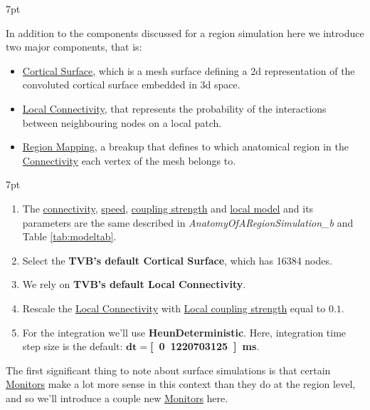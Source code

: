 \documentclass{tufte-handout}
\newenvironment{simulation}{%
  \def\FrameCommand{%
    \hspace{1pt}%
    {\color{ForestGreen}\vrule width 2pt}%
    {\color{simulationshade}\vrule width 4pt}%
    \colorbox{simulationshade}%
  }%
  \MakeFramed{\advance\hsize-\width\FrameRestore}%
  \noindent\hspace{-4.55pt}%
  \begin{adjustwidth}{}{7pt}%
  \vspace{2pt}\vspace{2pt}%
}
{%
  \vspace{2pt}\end{adjustwidth}\endMakeFramed%
}
\newenvironment{blah}{%
  \def\FrameCommand{%
    \hspace{1pt}%
    {\color{DarkOrange}\vrule width 2pt}%
    {\color{PeachPuff}\vrule width 4pt}%
    \colorbox{PeachPuff}%
  }%
  \MakeFramed{\advance\hsize-\width\FrameRestore}%
  \noindent\hspace{-4.55pt}%
  \begin{adjustwidth}{}{7pt}%
  \vspace{2pt}\vspace{2pt}%
}
{%
  \vspace{2pt}\end{adjustwidth}\endMakeFramed%
}
\begin{document}
\begin{blah}
In addition to the components discussed for a
region simulation here we introduce two major components, that is:
\begin{itemize}
\item \underline{Cortical Surface}, which is a mesh surface defining
a 2d representation of the convoluted cortical surface embedded in 3d space.
\item \underline{Local Connectivity}, that represents the probability of the interactions between neighbouring nodes on a local patch. 
\item \underline{Region Mapping},  a breakup that defines to which anatomical region in the \underline{Connectivity} each vertex of the mesh belongs to. 
\end{itemize}
\end{blah}

\begin{simulation}
\begin{enumerate}
\item The \underline{connectivity}, \underline{speed}, \underline{coupling strength} and \underline{local model} and its parameters are the same described in  \textit{AnatomyOfARegionSimulation\_b} and Table \ref{tab:modeltab}.
\item Select the \textbf{TVB's default Cortical Surface}, which has 16384 nodes. 
\item We rely on \textbf{TVB's default Local Connectivity}.
\item Rescale the \underline{Local Connectivity} with \underline{Local coupling strength} equal to $\mathbf{0.1}$.
\item For the integration we'll use \textbf{HeunDeterministic}.  Here, integration time step size is the default: $\mathbf{dt=}$\textbf{\unit[0.1220703125]{ms}}.
\end{enumerate}
\end{simulation}

The first significant thing to note about surface simulations is that certain \underline{Monitors} make a lot more sense in this context than they do at the region level, and so we'll introduce a couple new \underline{Monitors} here.

\end{document}
